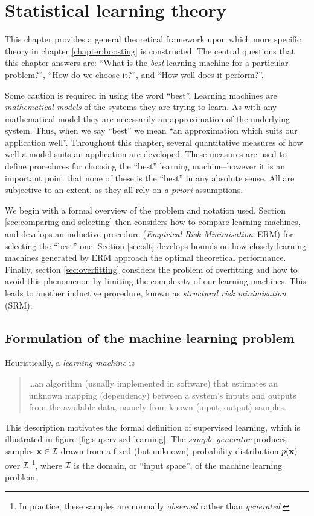 
\chapter{Statistical learning theory}
\label{chapter:slt}

This chapter provides a general theoretical framework upon which more
specific theory in chapter \ref{chapter:boosting} is constructed.  The
central questions that this chapter answers are: ``What is the
\emph{best} learning machine for a particular problem?'', ``How do we
choose it?'', and ``How well does it perform?''.

Some caution is required in using the word ``best''.  Learning
machines are \emph{mathematical models} of the systems they are trying
to learn.  As with any mathematical model they are necessarily an
approximation of the underlying system.  Thus, when we say
``best'' we mean ``an approximation which suits our application
well''.  Throughout this chapter, several quantitative
measures of how well a model suits an application are developed.
These measures are used to define procedures for choosing the ``best''
learning machine--however it is an important point that none of
these is the ``best'' in any absolute sense.  All are subjective to an
extent, as they all rely on \emph{a priori} assumptions.

We begin with a formal overview of the problem and notation used.
Section \ref{sec:comparing and selecting} then considers how to
compare learning machines, and develops an inductive procedure
(\emph{Empirical Risk Minimisation}--ERM) for selecting the ``best'' one.
Section \ref{sec:slt} develops bounds on how closely learning machines
generated by ERM approach the optimal theoretical performance.
Finally, section \ref{sec:overfitting} considers the problem of
overfitting and how to avoid this phenomenon by limiting the
complexity of our learning machines.  This leads to another inductive
procedure, known as \emph{structural risk minimisation} (SRM).


\section{Formulation of the machine learning problem}
\label{sec:formulation}
\label{sec:learning machines}
Heuristically, a \emph{learning machine} is
%
\begin{quote}
	\ldots an algorithm (usually implemented in software) that
	estimates an unknown mapping (dependency) between a system's
	inputs and outputs from the available data, namely from known
	(input, output) samples. \cite{Cherkassky98}

\end{quote}
%
This description motivates the formal definition of supervised learning,
which is illustrated in figure \ref{fig:supervised learning}.  The
\emph{sample generator} produces samples $\mathbf{x} \in \mathcal{I}$ drawn from a
fixed (but unknown) probability distribution $p(\mathbf{x})$ over $\mathcal{I}$%
\footnote{In practice, these samples are normally \emph{observed}
rather than \emph{generated}.},
where $\mathcal{I}$ is the domain, or ``input space'', of the machine
learning problem.

